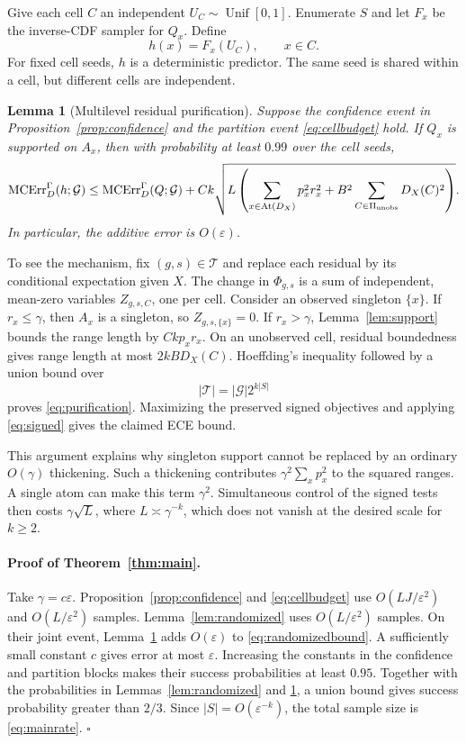 \documentclass{article}
\newtheorem{lemma}[theorem]{Lemma}
\theoremstyle{definition}
\theoremstyle{remark}
\newcommand{\1}{\mathbf 1}
\newcommand{\cG}{\mathcal G}
\newcommand{\MCE}{\operatorname{MCErr}}
\newcommand{\At}{\operatorname{At}}
\begin{document}
Give each cell $C$ an independent $U_C\sim\operatorname{Unif}[0,1]$. Enumerate $S$ and let $F_x$ be the inverse-CDF sampler for $Q_x$. Define
\begin{equation}
h(x)=F_x(U_C),\qquad x\in C.
\label{eq:rounding}
\end{equation}
For fixed cell seeds, $h$ is a deterministic predictor. The same seed is shared within a cell, but different cells are independent.

\begin{lemma}[Multilevel residual purification]\label{lem:purification}
Suppose the confidence event in Proposition~\ref{prop:confidence} and the partition event \eqref{eq:cellbudget} hold. If $Q_x$ is supported on $A_x$, then with probability at least $0.99$ over the cell seeds,
\begin{equation}
\MCE_D^\Gamma(h;\cG)
\le \MCE_D^\Gamma(Q;\cG)
+Ck\sqrt{L\left(\sum_{x\in\At(D_X)}p_x^2r_x^2+
B^2\sum_{C\in\Pi_{\rm unobs}}D_X(C)^2\right)}.
\label{eq:purification}
\end{equation}
In particular, the additive error is $O(\varepsilon)$.
\end{lemma}

To see the mechanism, fix $(g,s)\in\mathcal T$ and replace each residual by its conditional expectation given $X$. The change in $\Phi_{g,s}$ is a sum of independent, mean-zero variables $Z_{g,s,C}$, one per cell. Consider an observed singleton $\{x\}$. If $r_x\le\gamma$, then $A_x$ is a singleton, so $Z_{g,s,\{x\}}=0$. If $r_x>\gamma$, Lemma~\ref{lem:support} bounds the range length by $Ckp_xr_x$. On an unobserved cell, residual boundedness gives range length at most $2kB D_X(C)$. Hoeffding's inequality followed by a union bound over \[ |\mathcal T|=|\cG|2^{k|S|} \] proves \eqref{eq:purification}. Maximizing the preserved signed objectives and applying \eqref{eq:signed} gives the claimed ECE bound.

This argument explains why singleton support cannot be replaced by an ordinary $O(\gamma)$ thickening. Such a thickening contributes $\gamma^2\sum_xp_x^2$ to the squared ranges. A single atom can make this term $\gamma^2$. Simultaneous control of the signed tests then costs $\gamma\sqrt{L}$, where $L\asymp\gamma^{-k}$, which does not vanish at the desired scale for $k\ge2$.

\paragraph{Proof of Theorem~\ref{thm:main}.} Take $\gamma=c\varepsilon$. Proposition~\ref{prop:confidence} and \eqref{eq:cellbudget} use $O(LJ/\varepsilon^2)$ and $O(L/\varepsilon^2)$ samples. Lemma~\ref{lem:randomized} uses $O(L/\varepsilon^2)$ samples. On their joint event, Lemma~\ref{lem:purification} adds $O(\varepsilon)$ to \eqref{eq:randomizedbound}. A sufficiently small constant $c$ gives error at most $\varepsilon$. Increasing the constants in the confidence and partition blocks makes their success probabilities at least $0.95$. Together with the probabilities in Lemmas~\ref{lem:randomized} and \ref{lem:purification}, a union bound gives success probability greater than $2/3$. Since $|S|=O(\varepsilon^{-k})$, the total sample size is \eqref{eq:mainrate}. \hfill$\square$
\end{document}
